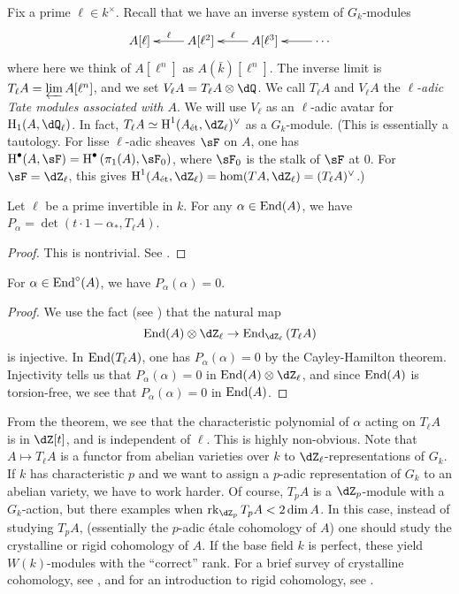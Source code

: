 \documentclass{article}
\begin{document}
Fix a prime $\ell\in k^\times$. Recall that we have an inverse system of 
$G_k$-modules 
\[\xymatrix{
  A[\ell] 
    & \ar[l]_-\ell A[\ell^2]
    & \ar[l]_-\ell A[\ell^3] 
    & \ar[l] \cdots
}\]
where here we think of $A[\ell^n]$ as $A(\bar k)[\ell^n]$. The inverse limit is 
$T_\ell A=\varprojlim A[\ell^n]$, and we set $V_\ell A=T_\ell A\otimes \dQ$. We 
call $T_\ell A$ and $V_\ell A$ the \emph{$\ell$-adic Tate modules associated with 
$A$}. We will use $V_\ell$ as an $\ell$-adic avatar for 
$\h_1(A,\dQ_\ell)$. In fact, $T_\ell A\simeq \h^1(\et A,\dZ_\ell)^\vee$ as a 
$G_k$-module. (This is essentially a tautology. For lisse $\ell$-adic sheaves 
$\sF$ on $A$, one has 
$\h^\bullet(A,\sF) = \h^\bullet\left(\pi_1(A),\sF_0\right)$, where $\sF_0$ is 
the stalk of $\sF$ at $0$. For $\sF=\dZ_\ell$, this gives 
$\h^1(\et A,\dZ_\ell) = \hom(T A,\dZ_\ell) = (T_\ell A)^\vee$.)

\begin{theorem}
Let $\ell$ be a prime invertible in $k$. For any $\alpha\in \operatorname{End}(A)$, we have 
$P_\alpha = \det(t\cdot 1-\alpha_\ast,T_\ell A)$. 
\end{theorem}
\begin{proof}
This is nontrivial. See \cite[I.10.20]{mi}. 
\end{proof}

\begin{corollary}
For $\alpha\in \operatorname{End}^\circ(A)$, we have $P_\alpha(\alpha)=0$. 
\end{corollary}
\begin{proof}
We use the fact (see \cite[I.10.15]{mi}) that the natural map 
\[
  \End(A)\otimes\dZ_\ell \to \End_{\dZ_\ell} \left(T_\ell A\right)
\]
is injective. In $\operatorname{End}(T_\ell A)$, one has $P_\alpha(\alpha)=0$ by the 
Cayley-Hamilton theorem. Injectivity tells us that 
$P_\alpha(\alpha)=0$ in $\End(A)\otimes\dZ_\ell$, and since $\operatorname{End}(A)$ is 
torsion-free, we see that $P_\alpha(\alpha)=0$ in $\operatorname{End}(A)$.
\end{proof}

From the theorem, we see that the characteristic polynomial of $\alpha$ acting 
on $T_\ell A$ is in $\dZ[t]$, and is independent of $\ell$. This is highly 
non-obvious. Note that $A\mapsto T_\ell A$ is a functor from abelian varieties 
over $k$ to $\dZ_\ell$-representations of $G_k$. If $k$ has characteristic $p$ 
and we want to assign a $p$-adic representation of $G_k$ to an abelian variety, 
we have to work harder. Of course, $T_p A$ is a $\dZ_p$-module with a 
$G_k$-action, but there examples when $\rank_{\dZ_p} T_p A < 2\dim A$. In this 
case, instead of studying $T_p A$, (essentially the $p$-adic \'etale cohomology 
of $A$) one should study the crystalline or rigid cohomology of $A$. If the 
base field $k$ is perfect, these yield $W(k)$-modules with the ``correct'' 
rank. For a brief survey of crystalline cohomology, see \cite{il94}, and for an  
introduction to rigid cohomology, see \cite{st07}. 
\end{document}
